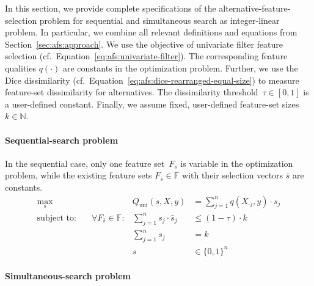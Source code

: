 \documentclass{article}
\theoremstyle{definition}
\begin{document}
In this section, we provide complete specifications of the alternative-feature-selection problem for sequential and simultaneous search as integer-linear problem.
In particular, we combine all relevant definitions and equations from Section~\ref{sec:afs:approach}.
We use the objective of univariate filter feature selection (cf.~Equation~\ref{eq:afs:univariate-filter}).
The corresponding feature qualities $q(\cdot)$ are constants in the optimization problem.
Further, we use the Dice dissimilarity (cf.~Equation~\ref{eq:afs:dice-rearranged-equal-size}) to measure feature-set dissimilarity for alternatives.
The dissimilarity threshold~$\tau \in [0,1]$ is a user-defined constant.
Finally, we assume fixed, user-defined feature-set sizes~$k \in \mathbb{N}$.

\paragraph{Sequential-search problem}

In the sequential case, only one feature set~$F_s$ is variable in the optimization problem, while the existing feature sets $F_{\bar{s}} \in \mathbb{F}$ with their selection vectors $\bar{s}$ are constants.
%
\begin{equation}
	\begin{aligned}
		\max_s &\quad & Q_{\text{uni}}(s,X,y) &= \sum_{j=1}^{n} q(X_{\cdot{}j},y) \cdot s_j \\
		\text{subject to:} &\quad \forall F_{\bar{s}} \in \mathbb{F}: & \sum_{j=1}^n s_j \cdot \bar{s}_j &\leq (1 - \tau) \cdot k \\
		&\quad & \sum_{j=1}^n s_j &= k \\
		&\quad & s &\in \{0,1\}^n
	\end{aligned}
	\label{eq:afs:afs-sequential-complete}
\end{equation}
%
\paragraph{Simultaneous-search problem}
\end{document}
